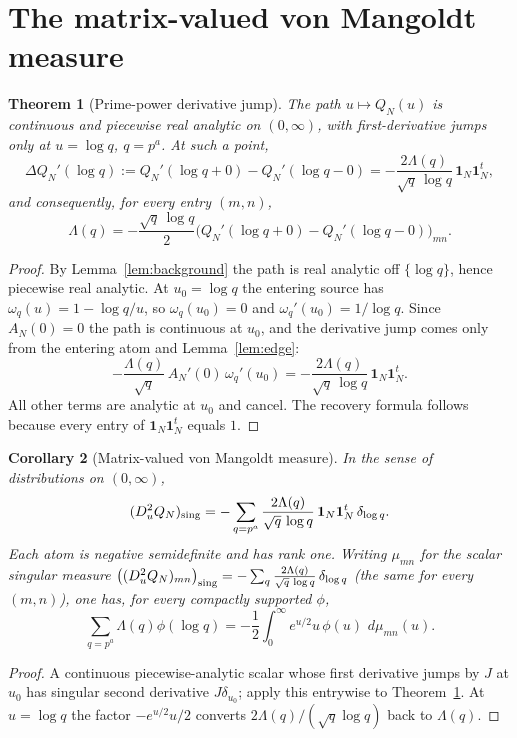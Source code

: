 \documentclass[11pt]{article}
\theoremstyle{plain}
\newtheorem{theorem}{Theorem}[section]
\newtheorem{corollary}[theorem]{Corollary}
\theoremstyle{definition}
\theoremstyle{remark}
\newcommand{\dd}{\,d}
\newcommand{\one}{\mathbf 1}
\newcommand{\Lam}{\Lambda}
\begin{document}
\section{The matrix-valued von Mangoldt measure}\label{sec:measure}

\begin{theorem}[Prime-power derivative jump]\label{thm:jump}
The path $u\mapsto Q_N(u)$ is continuous and piecewise real analytic on
$(0,\infty)$, with first-derivative jumps only at $u=\log q$, $q=p^a$. At such a
point,
\[
        \Delta Q_N'(\log q):=Q_N'(\log q+0)-Q_N'(\log q-0)
        =-\frac{2\Lam(q)}{\sqrt q\,\log q}\,\one_N\one_N^t,
\]
and consequently, for every entry $(m,n)$,
\[
        \Lam(q)=-\frac{\sqrt q\,\log q}{2}
        \bigl(Q_N'(\log q+0)-Q_N'(\log q-0)\bigr)_{mn}.
\]
\end{theorem}

\begin{proof}
By Lemma~\ref{lem:background} the path is real analytic off $\{\log q\}$, hence
piecewise real analytic. At $u_0=\log q$ the entering source has
$\omega_q(u)=1-\log q/u$, so $\omega_q(u_0)=0$ and $\omega_q'(u_0)=1/\log q$.
Since $A_N(0)=0$ the path is continuous at $u_0$, and the derivative jump comes
only from the entering atom and Lemma~\ref{lem:edge}:
\[
 -\frac{\Lam(q)}{\sqrt q}\,A_N'(0)\,\omega_q'(u_0)
 =-\frac{2\Lam(q)}{\sqrt q\,\log q}\,\one_N\one_N^t .
\]
All other terms are analytic at $u_0$ and cancel. The recovery formula follows
because every entry of $\one_N\one_N^t$ equals $1$.
\end{proof}

\begin{corollary}[Matrix-valued von Mangoldt measure]\label{cor:measure}
In the sense of distributions on $(0,\infty)$,
\[
        (D_u^2Q_N)_{\rm sing}
        =-\sum_{q=p^a}\frac{2\Lam(q)}{\sqrt q\,\log q}\,
        \one_N\one_N^t\,\delta_{\log q}.
\]
Each atom is negative semidefinite and has rank one. Writing $\mu_{mn}$ for the
scalar singular measure $\bigl((D_u^2Q_N)_{mn}\bigr)_{\rm sing}
=-\sum_q\frac{2\Lam(q)}{\sqrt q\,\log q}\,\delta_{\log q}$ (the same for every
$(m,n)$), one has, for every compactly supported $\phi$,
\[
 \sum_{q=p^a}\Lam(q)\phi(\log q)
 =-\frac12\int_0^\infty e^{u/2}u\,\phi(u)\,\dd\mu_{mn}(u).
\]
\end{corollary}

\begin{proof}
A continuous piecewise-analytic scalar whose first derivative jumps by $J$ at
$u_0$ has singular second derivative $J\delta_{u_0}$; apply this entrywise to
Theorem~\ref{thm:jump}. At $u=\log q$ the factor $-e^{u/2}u/2$ converts
$2\Lam(q)/(\sqrt q\log q)$ back to $\Lam(q)$.
\end{proof}
\end{document}
